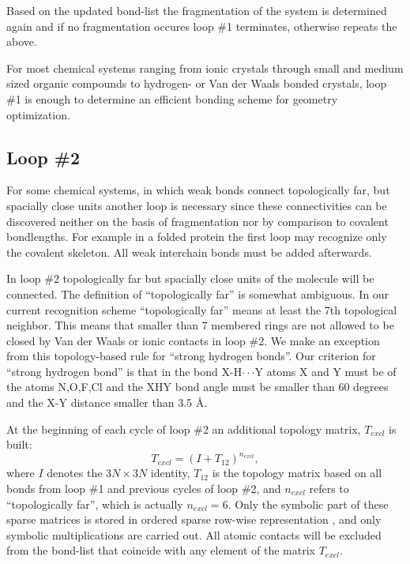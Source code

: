 \documentclass[prl,aps,preprint,superbib,12pt]{revtex4}
\begin{document}
Based on the updated bond-list the fragmentation of the system
is determined again and if no fragmentation occures loop \#1
terminates, otherwise repeats the above.

For most chemical systems ranging from ionic crystals through
small and medium sized organic compounds to hydrogen- 
or Van der Waals bonded crystals, loop \#1 is enough 
to determine an efficient bonding scheme for geometry optimization.  

\subsection{Loop \#2}
For some chemical systems, in which 
weak bonds connect topologically far, but spacially close units
another loop is necessary since these connectivities can 
be discovered neither on the basis of fragmentation nor by comparison
to covalent bondlengths.
For example in a folded protein the first loop may recognize only
the covalent skeleton. All weak interchain bonds must be added
afterwards. 

In loop \#2 topologically far but spacially
close units of the molecule will be connected.    
The definition of ``topologically far'' is somewhat
ambiguous. In our current recognition scheme ``topologically far''
means at least the 7th topological neighbor. This means that
smaller than 7 membered rings are not allowed to 
be closed by Van der Waals
or ionic contacts in loop \#2. We make an exception from 
this topology-based rule for 
``strong hydrogen bonds''. Our criterion for ``strong
hydrogen bond'' is that in the bond X-H$\cdot\cdot\cdot$Y
atoms X and Y must be of the atoms N,O,F,Cl and the XHY bond angle
must be smaller than 60 degrees and the X-Y distance smaller than 
3.5 \AA.

At the beginning of each cycle of loop \#2
an additional topology matrix, $T_{excl}$ is built:
\begin{equation}
T_{excl} = {(I+T_{12})}^{n_{excl}} ,
\end{equation}
where $I$ denotes the $3N \times 3N$ identity, $T_{12}$ is the 
topology matrix based on all bonds from loop \#1 and previous 
cycles of loop \#2, and $n_{excl}$ refers to ``topologically far'',
which is actually $n_{excl}=6$.
Only the symbolic part of these sparse matrices is stored 
in ordered sparse row-wise representation \cite{SPissanetzky84},
and only symbolic multiplications are carried out.
All atomic contacts will be excluded from the bond-list
that coincide with any element of the matrix $T_{excl}$. 
\end{document}
